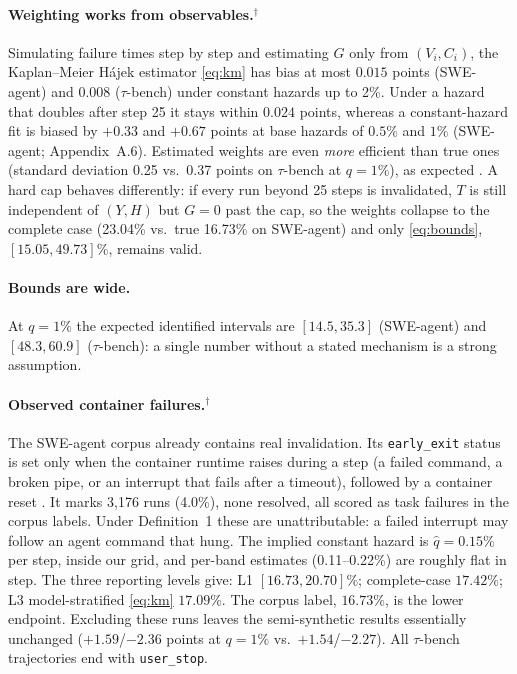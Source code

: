 \documentclass[letterpaper]{article} %
\newcommand{\rev}{$^{\dagger}$}
\begin{document}
\paragraph{Weighting works from observables.\rev} Simulating failure times step
by step and estimating $G$ only from $(V_i,C_i)$, the Kaplan--Meier H\'ajek
estimator \eqref{eq:km} has bias at most $0.015$ points (SWE-agent) and
$0.008$ ($\tau$-bench) under constant hazards up to 2\%. Under a hazard that
doubles after step 25 it stays within $0.024$ points, whereas a
constant-hazard fit is biased by $+0.33$ and $+0.67$ points at base hazards of
$0.5\%$ and $1\%$ (SWE-agent; Appendix~A.6). Estimated weights are even
\emph{more} efficient than true ones (standard deviation 0.25 vs.\ 0.37 points
on $\tau$-bench at $q=1\%$), as expected \citep{robins1994estimation}. A hard
cap behaves differently: if every run beyond 25 steps is invalidated, $T$ is
still independent of $(Y,H)$ but $G=0$ past the cap, so the weights collapse to
the complete case (23.04\% vs.\ true 16.73\% on SWE-agent) and only
\eqref{eq:bounds}, $[15.05, 49.73]\%$, remains valid.

\paragraph{Bounds are wide.} At $q=1\%$ the expected identified intervals are
$[14.5,35.3]$ (SWE-agent) and $[48.3,60.9]$ ($\tau$-bench): a single number
without a stated mechanism is a strong assumption.

\paragraph{Observed container failures.\rev} The SWE-agent corpus already
contains real invalidation. Its \texttt{early\_exit} status is set only when the
container runtime raises during a step (a failed command, a broken pipe, or an
interrupt that fails after a timeout), followed by a container reset
\citep{sweagent2024code}. It marks 3{,}176 runs (4.0\%), none resolved, all
scored as task failures in the corpus labels. Under Definition~1 these are
unattributable: a failed interrupt may follow an agent command that hung. The
implied constant hazard is $\hat q=0.15\%$ per step, inside our grid, and
per-band estimates (0.11--0.22\%) are roughly flat in step. The three reporting
levels give: L1 $[16.73,20.70]\%$; complete-case $17.42\%$; L3
model-stratified \eqref{eq:km} $17.09\%$. The corpus label, $16.73\%$, is the
lower endpoint. Excluding these runs leaves the semi-synthetic results
essentially unchanged ($+1.59$/$-2.36$ points at $q=1\%$ vs.\
$+1.54$/$-2.27$). All $\tau$-bench trajectories end with \texttt{user\_stop}.
\end{document}
